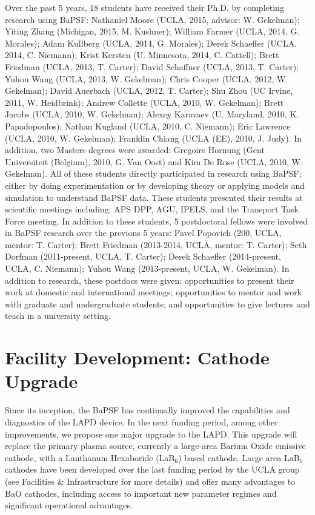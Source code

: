 \documentclass[11pt]{article}
\begin{document}
Over the past 5 years, 18 students have received their Ph.D. by completing
research using BaPSF:  Nathaniel Moore (UCLA, 2015, advisor: W. Gekelman); Yiting
Zhang (Michigan, 2015, M. Kushner); William Farmer (UCLA, 2014, G. Morales);
Adam Kullberg (UCLA, 2014, G. Morales); Derek Schaeffer (UCLA, 2014,
C. Niemann); Krist Kersten (U. Minnesota, 2014, C. Cattell); 
Brett Friedman (UCLA, 2013, T. Carter); David Schaffner (UCLA, 2013,
T. Carter); Yuhou Wang (UCLA, 2013, W. Gekelman); Chris Cooper (UCLA, 2012,
W. Gekelman); David Auerbach (UCLA, 2012, T. Carter); Shu Zhou (UC Irvine,
2011, W. Heidbrink); Andrew Collette (UCLA, 2010, W. Gekelman); Brett
Jacobs (UCLA, 2010, W. Gekelman); Alexey Karavaev (U. Maryland, 2010,
K. Papadopoulos); Nathan Kugland (UCLA, 2010, C. Niemann); Eric
Lawrence (UCLA, 2010, W. Gekelman); Franklin Chiang (UCLA (EE), 2010,
J. Judy).  In addition, two Masters degrees were awarded: Gregoire Hornung (Gent Universiteit (Belgium),
2010, G. Van Oost) and Kim De Rose (UCLA, 2010, W. Gekelman).   All of
these students directly participated in research using BaPSF; either
by doing experimentation or by developing theory or applying models
and simulation to understand BaPSF data.  These students presented
their results at scientific meetings including: APS DPP, AGU, IPELS,
and the Transport Task Force meeting.   In addition to these students,
5 postdoctoral fellows were involved in BaPSF research over the previous 5 years:
Pavel Popovich (200, UCLA, mentor: T. Carter); Brett Friedman
(2013-2014, UCLA, mentor: T. Carter); Seth Dorfman (2011-present,
UCLA, T. Carter); Derek Schaeffer (2014-present, UCLA, C. Niemann);
Yuhou Wang (2013-present, UCLA, W. Gekelman).  In addition to
research, these postdocs were given: opportunities to present their
work at domestic and international meetings; opportunities to mentor and work with
graduate and undergraduate students; and opportunities to give lectures
and teach in a university setting.  


\section{Facility Development: Cathode Upgrade}

Since its inception, the BaPSF has continually improved the capabilities
and diagnostics of the LAPD device. In the next funding period, among
other improvements, we propose one major upgrade to the LAPD. This
upgrade will replace the primary plasma source, currently a large-area
Barium Oxide emissive cathode, with a Lanthanum Hexaboride (LaB$_6$) based
cathode. Large area LaB$_{6}$ cathodes have been developed over the last
funding period by the UCLA group (see Facilities \& Infrastructure for more details) and
offer many advantages to BaO cathodes, including access to important new
parameter regimes and significant operational advantages.
\end{document}
